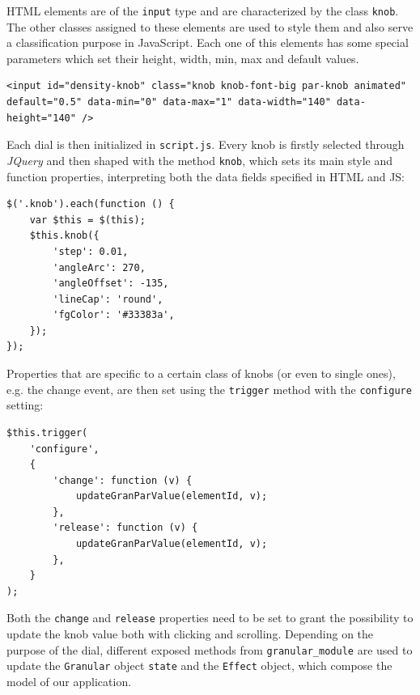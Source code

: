 \documentclass[12pt, a4paper]{article}
\begin{document}
HTML elements are of the \texttt{input} type and are characterized by the class \texttt{knob}. The other classes assigned to these elements are used to style them and also serve a classification purpose in JavaScript. Each one of this elements has some special parameters which set their height, width, min, max and default values.

\vspace{0.5cm}
\begin{lstlisting}[style=htmlcssjs]
<input id="density-knob" class="knob knob-font-big par-knob animated" default="0.5" data-min="0" data-max="1" data-width="140" data-height="140" />
\end{lstlisting}

Each dial is then initialized in \texttt{script.js}. Every knob is firstly selected through \emph{JQuery} and then shaped with the method \texttt{knob}, which sets its main style and function properties, interpreting both the data fields specified in HTML and JS:

\vspace{0.5cm}
\begin{lstlisting}[style=htmlcssjs]
$('.knob').each(function () {
    var $this = $(this);
    $this.knob({
        'step': 0.01,
        'angleArc': 270,
        'angleOffset': -135,
        'lineCap': 'round',
        'fgColor': '#33383a',
    });
});
\end{lstlisting}

\noindent Properties that are specific to a certain class of knobs (or even to single ones), e.g. the change event, are then set using the \texttt{trigger} method with the \texttt{configure} setting:

\vspace{0.5cm}
\begin{lstlisting}[style=htmlcssjs]
$this.trigger(
    'configure',
    {
        'change': function (v) {
            updateGranParValue(elementId, v);
        },
        'release': function (v) {
            updateGranParValue(elementId, v);
        }, 
    }
);
\end{lstlisting}

Both the \texttt{change} and \texttt{release} properties need to be set to grant the possibility to update the knob value both with clicking and scrolling. Depending on the purpose of the dial, different exposed methods from \texttt{granular\_module} are used to update the \texttt{Granular} object \texttt{state} and the \texttt{Effect} object, which compose the model of our application.
\end{document}
